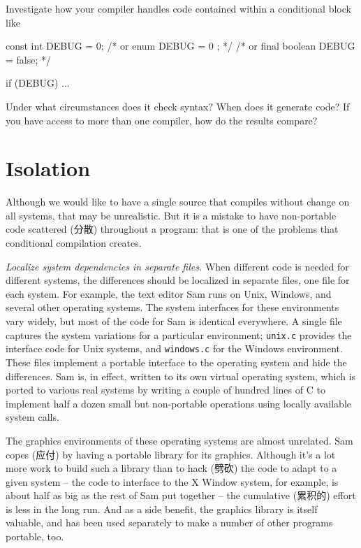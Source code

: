 \begin{exercise}
    Investigate how your compiler handles code contained within a
    conditional block like
    \begin{wellcode}
        const int DEBUG = 0;
        /* or enum { DEBUG = 0 }; */
        /* or final boolean DEBUG = false; */

        if (DEBUG) {
            ...
        }
    \end{wellcode}
    Under what circumstances does it check syntax? When does it generate
    code? If you have access to more than one compiler, how do the results
    compare?
\end{exercise}

\section{Isolation}
\label{sec:isolation}

Although we would like to have a single source that compiles without change
on all systems, that may be unrealistic. But it is a mistake to have
non-portable code scattered (分散) throughout a program: that is one of the
problems that conditional compilation creates.

\emph{Localize system dependencies in separate files.} When different code
is needed for different systems, the differences should be localized in
separate files, one file for each system. For example, the text editor Sam
runs on Unix, Windows, and several other operating systems. The system
interfaces for these environments vary widely, but most of the code for Sam
is identical everywhere. A single file captures the system variations for a
particular environment; \verb'unix.c' provides the interface code for Unix
systems, and \verb'windows.c' for the Windows environment. These files
implement a portable interface to the operating system and hide the
differences. Sam is, in effect, written to its own virtual operating
system, which is ported to various real systems by writing a couple of
hundred lines of C to implement half a dozen small but non-portable
operations using locally available system calls.

The graphics environments of these operating systems are almost unrelated.
Sam copes (应付) by having a portable library for its graphics. Although
it's a lot more work to build such a library than to hack (劈砍) the code
to adapt to a given system -- the code to interface to the X Window system,
for example, is about half as big as the rest of Sam put together -- the
cumulative (累积的) effort is less in the long run. And as a side benefit,
the graphics library is itself valuable, and has been used separately to
make a number of other programs portable, too.

